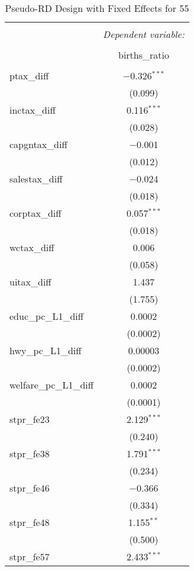 
\begin{table}[!htbp] \centering 
  \caption{Pseudo-RD Design with Fixed Effects for  55} 
  \label{} 
\begin{tabular}{@{\extracolsep{5pt}}lc} 
\\[-1.8ex]\hline 
\hline \\[-1.8ex] 
 & \multicolumn{1}{c}{\textit{Dependent variable:}} \\ 
\cline{2-2} 
\\[-1.8ex] & births\_ratio \\ 
\hline \\[-1.8ex] 
 ptax\_diff & $-$0.326$^{***}$ \\ 
  & (0.099) \\ 
  inctax\_diff & 0.116$^{***}$ \\ 
  & (0.028) \\ 
  capgntax\_diff & $-$0.001 \\ 
  & (0.012) \\ 
  salestax\_diff & $-$0.024 \\ 
  & (0.018) \\ 
  corptax\_diff & 0.057$^{***}$ \\ 
  & (0.018) \\ 
  wctax\_diff & 0.006 \\ 
  & (0.058) \\ 
  uitax\_diff & 1.437 \\ 
  & (1.755) \\ 
  educ\_pc\_L1\_diff & 0.0002 \\ 
  & (0.0002) \\ 
  hwy\_pc\_L1\_diff & 0.00003 \\ 
  & (0.0002) \\ 
  welfare\_pc\_L1\_diff & 0.0002 \\ 
  & (0.0001) \\ 
  stpr\_fe23 & 2.129$^{***}$ \\ 
  & (0.240) \\ 
  stpr\_fe38 & 1.791$^{***}$ \\ 
  & (0.234) \\ 
  stpr\_fe46 & $-$0.366 \\ 
  & (0.334) \\ 
  stpr\_fe48 & 1.155$^{**}$ \\ 
  & (0.500) \\ 
  stpr\_fe57 & 2.433$^{***}$ \\ 

\end{tabular}
\end{table}
